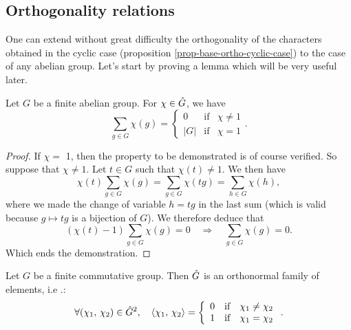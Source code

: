 \subsection{Orthogonality relations}
\label{sect2-dual-grpe-abelien-rel-orthogonalite}


One can extend without great difficulty the orthogonality of the characters obtained in the cyclic case (proposition \ref{prop-base-ortho-cyclic-case}) to the case of any abelian group. Let's start by proving a lemma which will be very useful later.

\begin{lem}
\label{lem-orth-character-abelien}
Let $G$ be a finite abelian group. For $\chi \in \hat{G}$, we have
\begin{equation}
\label{eq-sum-caracteres-grpe-abelien}
\sum_{g \in G}{\chi(g)} = \left\{\begin{array}{lll} 0 & \text{if} & \chi \neq 1 \\ |G| & \text{if} & \chi = 1 \end{array} \right. .
\end{equation}
\end{lem}

\begin{proof}
If $\chi = $ 1, then the property to be demonstrated is of course verified. So suppose that $\chi \neq 1$. Let $ t \in G$ such that $\chi(t) \neq 1$. We then have
\begin{equation*}
\chi(t) \sum_{g \in G}{\chi(g)} = \sum_{g \in G}{\chi(tg)} = \sum_{h \in G}{\chi(h)},
\end{equation*}
where we made the change of variable $ h = t g$ in the last sum (which is valid because $g \mapsto t g$ is a bijection of $G$). We therefore deduce that
\begin{equation*}
(\chi(t) -1) \sum_{g \in G}{\chi(g)} = 0 \quad \Longrightarrow \quad \sum_{g \in G}{\chi(g)} = 0.
\end{equation*}
Which ends the demonstration.
\end{proof}


\begin{prop}
\label{prop-orthogonalite-car-grpe-abelien}
 Let $G$ be a finite commutative group. Then $\hat{G}$ is an orthonormal family of elements, i.e .:
\begin{equation*}
\forall(\chi_1, \, \chi_2) \in \hat{G}^2, \quad \langle \chi_1,\,\chi_2\rangle = \left\{\begin{array}{lll} 0 & \text{if} & \chi_1 \neq \chi_2 \\1 & \text{if} & \chi_1 = \chi_2 \end{array} \right. .
\end{equation*}
\end{prop}

